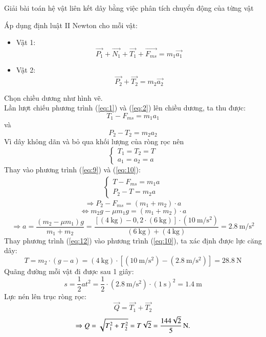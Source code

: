 \begin{dang}{Giải bài toán hệ vật liên kết dây bằng việc phân tích chuyển động của từng vật}
{{\begin{enumerate}[label=\alph*)]
\begin{center}
\end{center}
Áp dụng định luật II Newton cho mỗi vật:
\begin{itemize}
	\item Vật 1:
	\begin{equation}
		\label{eq:7}
		\overrightarrow{P_1}+\overrightarrow{N_1}+\overrightarrow{T_1}+\overrightarrow{F_{ms}}=m_1\overrightarrow{a_1}
	\end{equation}
	\item Vật 2:
	\begin{equation}
		\label{eq:8}
		\overrightarrow{P_2}+\overrightarrow{T_2}=m_2\overrightarrow{a_2}
	\end{equation}
\end{itemize}
Chọn chiều dương như hình vẽ.\\
Lần lượt chiếu phương trình (\ref{eq:1}) và (\ref{eq:2}) lên chiều dương, ta thu được:
\begin{equation}
	\label{eq:9}
	T_1-F_{ms}=m_1a_1
\end{equation}
và
\begin{equation}
	\label{eq:10}
	P_2-T_2=m_2a_2
\end{equation}
Vì dây không dãn và bỏ qua khối lượng của ròng rọc nên
$$\begin{cases}
	T_1=T_2=T\\
	a_1=a_2=a
\end{cases}$$
Thay vào phương trình (\ref{eq:9}) và (\ref{eq:10}):
\begin{align}
	\label{eq:11}
	\begin{cases}
		T-F_{ms}=m_1a\\
		P_2-T=m_2a
	\end{cases}
\end{align}
$$\Rightarrow P_2-F_{ms}=\left(m_1+m_2\right)\cdot a$$
$$\Leftrightarrow m_2g-\mu m_1g=\left(m_1+m_2\right)\cdot a$$
\begin{equation}
	\label{eq:12}
	\Rightarrow a=\dfrac{\left(m_2-\mu m_1\right)g}{m_1+m_2}=\dfrac{\left[\left(\SI{4}{\kilogram}\right)-0,2\cdot\left(\SI{6}{\kilogram}\right)\right]\cdot\left(\SI{10}{\meter/\second^2}\right)}{\left(\SI{6}{\kilogram}\right)+\left(\SI{4}{\kilogram}\right)}=\SI{2.8}{\meter/\second^2}
\end{equation}
Thay phương trình (\ref{eq:12}) vào phương trình (\ref{eq:10}), ta xác định được lực căng dây:
$$T=m_2\cdot\left(g-a\right)=\left(\SI{4}{\kilogram}\right)\cdot\left[\left(\SI{10}{\meter/\second^2}\right)-\left(\SI{2.8}{\meter/\second^2}\right)\right]=\SI{28.8}{\newton}$$
Quãng đường mỗi vật đi được sau 1 giây:
$$s=\dfrac{1}{2}at^2=\dfrac{1}{2}\cdot\left(\SI{2.8}{\meter/\second^2}\right)\cdot\left(\SI{1}{\second}\right)^2=\SI{1.4}{\meter}$$
Lực nén lên trục ròng rọc:
$$\overrightarrow{Q}=\overrightarrow{T_1}+\overrightarrow{T_2}$$
$$\Rightarrow Q=\sqrt{T^2_1+T^2_2}=T\sqrt{2}=\xsi{\dfrac{144\sqrt{2}}{5}}{\newton}.$$
\end{enumerate}
}}
\end{dang}
